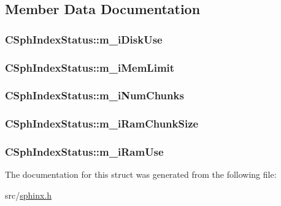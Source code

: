 \subsection{Member Data Documentation}
\hypertarget{structCSphIndexStatus_a346ad6878d3898277951995f0c34b428}{
\subsubsection[{m\-\_\-i\-Disk\-Use}]{ C\-Sph\-Index\-Status\-::m\-\_\-i\-Disk\-Use}}\label{structCSphIndexStatus_a346ad6878d3898277951995f0c34b428}
\hypertarget{structCSphIndexStatus_acfceb597fb404df8d0a8773b4cd4f3f4}{
\subsubsection[{m\-\_\-i\-Mem\-Limit}]{ C\-Sph\-Index\-Status\-::m\-\_\-i\-Mem\-Limit}}\label{structCSphIndexStatus_acfceb597fb404df8d0a8773b4cd4f3f4}
\hypertarget{structCSphIndexStatus_a78ea136b81b6c8ecdf1fd2ff5a0a67a1}{
\subsubsection[{m\-\_\-i\-Num\-Chunks}]{ C\-Sph\-Index\-Status\-::m\-\_\-i\-Num\-Chunks}}\label{structCSphIndexStatus_a78ea136b81b6c8ecdf1fd2ff5a0a67a1}
\hypertarget{structCSphIndexStatus_add6c2907eaf19e1f9154d7d3b782e321}{
\subsubsection[{m\-\_\-i\-Ram\-Chunk\-Size}]{ C\-Sph\-Index\-Status\-::m\-\_\-i\-Ram\-Chunk\-Size}}\label{structCSphIndexStatus_add6c2907eaf19e1f9154d7d3b782e321}
\hypertarget{structCSphIndexStatus_a40d35a6139a7c43c4159904d8de8786b}{
\subsubsection[{m\-\_\-i\-Ram\-Use}]{ C\-Sph\-Index\-Status\-::m\-\_\-i\-Ram\-Use}}\label{structCSphIndexStatus_a40d35a6139a7c43c4159904d8de8786b}


The documentation for this struct was generated from the following file\-:\begin{DoxyCompactItemize}
\item 
src/\hyperlink{sphinx_8h}{sphinx.\-h}\end{DoxyCompactItemize}
